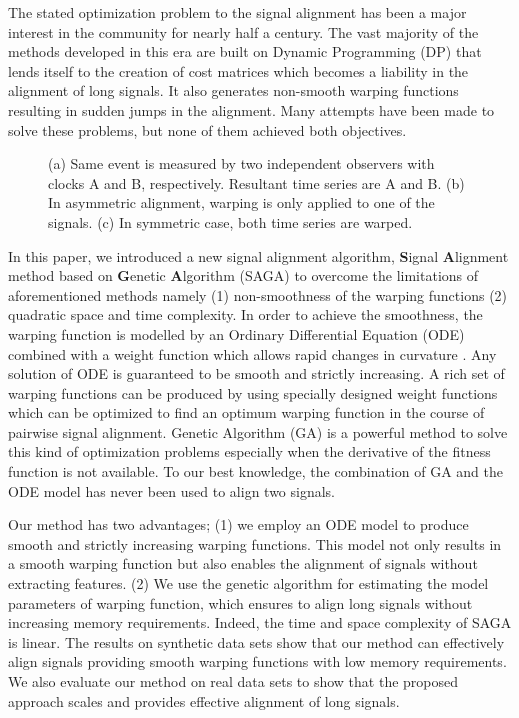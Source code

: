 \documentclass[number,1p,12pt]{elsarticle}
\begin{document}
The stated optimization problem to the signal alignment has been a major interest in the community for nearly half a century. The vast majority of the methods developed in this era are built on Dynamic Programming (DP) \cite{Bellman2003} that lends itself to the creation of cost matrices which becomes a liability in the alignment of long signals. It also generates non-smooth warping functions resulting in sudden jumps in the alignment. Many attempts have been made to solve these problems, but none of them achieved both objectives. 

\begin{figure}
\centering
{}\hspace{1cm}%
\hspace{1cm}%
\caption{(a) Same event is measured by two independent observers with clocks A and B, respectively. Resultant time series are A and B.  (b) In asymmetric alignment, warping is only applied to one of the signals. (c) In symmetric case, both time series are warped.  }
\label{Figure00}
\end{figure} 

In this paper, we introduced a new signal alignment algorithm, \textbf{S}ignal \textbf{A}lignment method based on \textbf{G}enetic \textbf{A}lgorithm (SAGA) to overcome the limitations of aforementioned methods namely (1) non-smoothness of the warping functions (2)  quadratic space and time complexity. In order to achieve the smoothness, the warping function is modelled by an Ordinary Differential Equation (ODE) combined with a weight function which allows rapid changes in curvature \cite{Ramsay1998a}. Any solution of ODE is guaranteed to be smooth and strictly increasing. A rich set of warping functions can be produced by using specially designed weight functions which can be optimized to find an optimum warping function in the course of pairwise signal alignment. Genetic Algorithm (GA) is a powerful method to solve this kind of optimization problems especially when the derivative of the fitness function is not available. To our best knowledge, the combination of GA and the ODE model has never been used to align two signals.

Our method has two advantages; (1) we employ an ODE model to produce smooth and strictly increasing warping functions. This model not only results in a smooth warping function but also enables the alignment of signals without extracting features. (2) We use the genetic algorithm for estimating the model parameters of warping function, which ensures to align long signals without increasing memory requirements. Indeed, the time and space complexity of SAGA is linear. The results on synthetic data sets show that our method can effectively align signals providing smooth warping functions with low memory requirements. We also evaluate our method on real data sets to show that the proposed approach scales and provides effective alignment of long signals.
\end{document}
